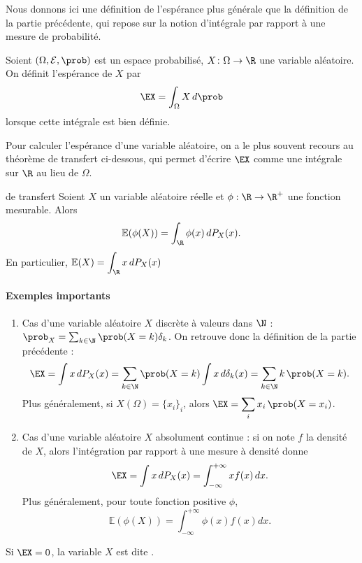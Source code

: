 Nous donnons ici une définition de l'espérance plus générale que la définition de la partie précédente, qui repose sur la notion d'intégrale par rapport à une mesure de probabilité.

\begin{definition}{}{}
	Soient $(\Omega,\mathcal{E},\prob)$ est un espace probabilisé, $X \colon \Omega \to \R $ une variable aléatoire. On définit l'espérance de $X$ par 
	$$\EX = \int_\Omega X \,d\prob$$	
lorsque cette intégrale est bien définie.
\end{definition}

Pour calculer l'espérance d'une variable aléatoire, on a le plus souvent recours au théorème de transfert ci-dessous, qui permet d'écrire $\EX$ comme une intégrale sur $\R$ au lieu de $\Omega$.

\begin{theoreme}{de transfert}{}
Soient $X$ un variable aléatoire réelle et $\phi:\R\to \R^+$ une fonction mesurable. Alors 	
	$$\mathbb{E}(\phi(X)) = \int_\R \phi(x) \, dP_X(x).$$
En particulier, $\displaystyle \mathbb{E}(X) = \int_\R x \, dP_X(x)$
\end{theoreme}

\paragraph{Exemples importants}
\begin{enumerate}
\item Cas d'une variable aléatoire $X$ discrète à valeurs dans $\N$ : $\prob_X = \sum_{k\in \N} \prob(X=k)\delta_k$. On retrouve donc la définition de la partie précédente :
	$$\EX = \int x \, dP_X (x) = \sum_{k\in \N} \prob(X=k) \int x\, d\delta_k(x) = \sum_{k\in \N} k \,\prob(X=k).$$
Plus généralement, si $X(\Omega) = \{x_i\}_i$, alors $\displaystyle \EX = \sum_i x_i \, \prob(X=x_i)$.
\item Cas d'une variable aléatoire $X$ absolument continue : si on note $f$ la densité de $X$, alors l'intégration par rapport à une mesure à densité donne
	$$\EX = \int x \, dP_X(x) = \int_{-\infty}^{+\infty} x f(x)\, dx.$$
Plus généralement, pour toute fonction positive $\phi$,
	$$\mathbb{E}(\phi(X)) = \int_{-\infty}^{+\infty} \phi(x) f(x)dx.$$
\end{enumerate}

\begin{definition}{}{}
	Si $\EX = 0$, la variable $X$ est dite . 
\end{definition}

